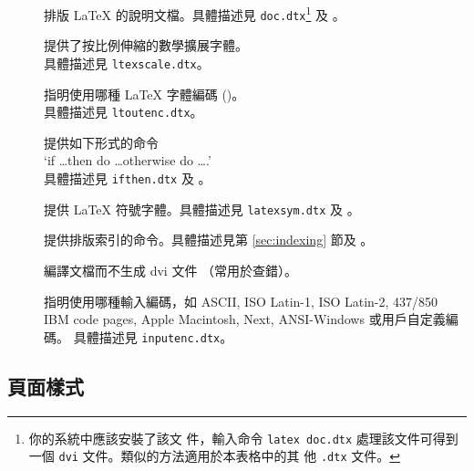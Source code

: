 \begin{table}[btp]
\caption{隨 \LaTeX 一起發行的宏包。} \label{packages}
\begin{lined}{\textwidth}
\begin{description}
\item[\normalfont{}] 排版 \LaTeX{} 的說明文檔。具體描述見 \texttt{doc.dtx}\footnote{你的系統中應該安裝了該文
   件，輸入命令 \texttt{latex doc.dtx} 處理該文件可得到一個 \texttt{dvi} 文件。類似的方法適用於本表格中的其
   他 \texttt{.dtx} 文件。} 及 \companion。

\item[\normalfont{}] 提供了按比例伸縮的數學擴展字體。\\
  具體描述見 \texttt{ltexscale.dtx}。

\item[\normalfont{}] 指明使用哪種 \LaTeX{} 字體編碼 ()。\\
  具體描述見 \texttt{ltoutenc.dtx}。

\item[\normalfont{}] 提供如下形式的命令\\
  `if \ldots then do \ldots otherwise do \ldots.'\\具體描述見 
  \texttt{ifthen.dtx} 及 \companion。

\item[\normalfont{}]
  提供 \LaTeX{} 符號字體。具體描述見 \texttt{latexsym.dtx} 及 \companion。

\item[\normalfont{}]
  提供排版索引的命令。具體描述見第 \ref{sec:indexing} 節及 \companion。

\item[\normalfont{}] 編譯文檔而不生成 dvi 文件 （常用於查錯）。

\item[\normalfont{}] 指明使用哪種輸入編碼，如 ASCII, ISO Latin-1, ISO Latin-2, 437/850 IBM
  code pages,  Apple Macintosh, Next,
  ANSI-Windows 或用戶自定義編碼。
  具體描述見 \texttt{inputenc.dtx}。
\end{description}
\end{lined}
\end{table}

\subsection{頁面樣式}

